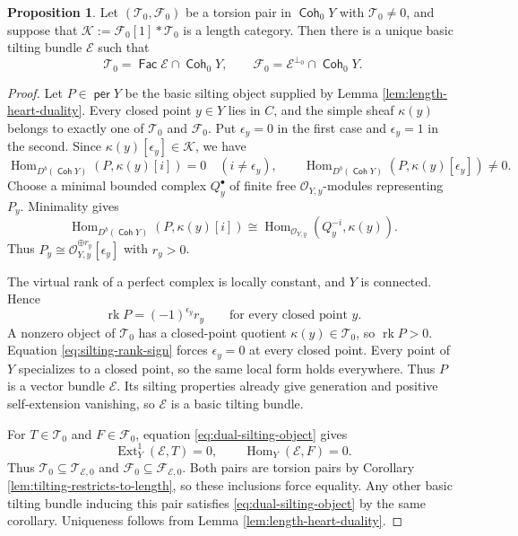 \documentclass[a4paper,reqno]{amsart}
\def\E{\mathcal{E}}
\def\F{\mathcal{F}}
\def\K{\mathcal{K}}
\def\O{\mathcal{O}}
\def\T{\mathcal{T}}
\DeclareMathOperator{\Fac}{\mathsf{Fac}}
\DeclareMathOperator{\Coh}{\mathsf{Coh}}
\DeclareMathOperator{\per}{\mathsf{per}}
\DeclareMathOperator{\Hom}{Hom}
\DeclareMathOperator{\Ext}{Ext}
\DeclareMathOperator{\rk}{rk}
\theoremstyle{definition}
\newtheorem{Prop}[Thm]{Proposition}
\begin{document}
\begin{Prop}\label{prop:length-heart-to-bundle}
Let $(\T_0,\F_0)$ be a torsion pair in $\Coh_0Y$ with $\T_0\ne0$, and suppose that $\K:=\F_0[1]*\T_0$ is a length category. Then there is a unique basic tilting bundle $\E$ such that
\[
\T_0=\Fac\E\cap\Coh_0Y,
\qquad\F_0=\E^{\perp_0}\cap\Coh_0Y.
\]
\end{Prop}
\begin{proof}
Let $P\in\per Y$ be the basic silting object supplied by Lemma \ref{lem:length-heart-duality}. Every closed point $y\in Y$ lies in $C$, and the simple sheaf $\kappa(y)$ belongs to exactly one of $\T_0$ and $\F_0$. Put $\epsilon_y=0$ in the first case and $\epsilon_y=1$ in the second. Since $\kappa(y)[\epsilon_y]\in\K$, we have
\[
\Hom_{D^b(\Coh Y)}(P,\kappa(y)[i])=0\quad(i\ne\epsilon_y),
\qquad
\Hom_{D^b(\Coh Y)}(P,\kappa(y)[\epsilon_y])\ne0.
\]
Choose a minimal bounded complex $Q_y^\bullet$ of finite free $\O_{Y,y}$-modules representing $P_y$. Minimality gives
\[
\Hom_{D^b(\Coh Y)}(P,\kappa(y)[i])
\cong\Hom_{\O_{Y,y}}(Q_y^{-i},\kappa(y)).
\]
Thus $P_y\cong\O_{Y,y}^{\oplus r_y}[\epsilon_y]$ with $r_y>0$.

The virtual rank of a perfect complex is locally constant, and $Y$ is connected. Hence
\begin{equation}\label{eq:silting-rank-sign}
\rk P=(-1)^{\epsilon_y}r_y
\qquad\text{for every closed point }y.
\end{equation}
A nonzero object of $\T_0$ has a closed-point quotient $\kappa(y)\in\T_0$, so $\rk P>0$. Equation \eqref{eq:silting-rank-sign} forces $\epsilon_y=0$ at every closed point. Every point of $Y$ specializes to a closed point, so the same local form holds everywhere. Thus $P$ is a vector bundle $\E$. Its silting properties already give generation and positive self-extension vanishing, so $\E$ is a basic tilting bundle.

For $T\in\T_0$ and $F\in\F_0$, equation \eqref{eq:dual-silting-object} gives
\[
\Ext_Y^1(\E,T)=0,
\qquad\Hom_Y(\E,F)=0.
\]
Thus $\T_0\subseteq\T_{\E,0}$ and $\F_0\subseteq\F_{\E,0}$. Both pairs are torsion pairs by Corollary \ref{lem:tilting-restricts-to-length}, so these inclusions force equality. Any other basic tilting bundle inducing this pair satisfies \eqref{eq:dual-silting-object} by the same corollary. Uniqueness follows from Lemma \ref{lem:length-heart-duality}.
\end{proof}
\end{document}
